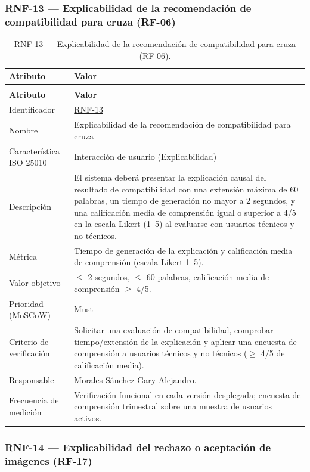 \documentclass[journal,onecolumn]{IEEEtran}
\makeatletter
\newenvironment{atributos}[2]{%
	\small
	\begin{longtable}{@{}>{\raggedright\arraybackslash}p{4.2cm} >{\raggedright\arraybackslash}p{11.2cm}@{}}
		\caption{#2}\label{tab:#1}\\
		\toprule
		\textbf{Atributo} & \textbf{Valor} \\
		\midrule
		\endfirsthead
		\multicolumn{2}{@{}l}{\small\itshape (continuación)}\\
		\toprule
		\textbf{Atributo} & \textbf{Valor} \\
		\midrule
		\endhead
		\bottomrule
		\endlastfoot
	}{%
	\end{longtable}
	\normalsize
}
\makeatother
\begin{document}
	\subsubsection{RNF-13 --- Explicabilidad de la recomendación de compatibilidad para cruza (RF-06)}
	
	\begin{atributos}{RNF-13}{RNF-13 --- Explicabilidad de la recomendación de compatibilidad para cruza (RF-06).}
		Identificador & \hyperref[tab:RNF-13]{RNF-13} \\
		Nombre & Explicabilidad de la recomendación de compatibilidad para cruza \\
		Característica ISO 25010 & Interacción de usuario (Explicabilidad) \\
		Descripción & El sistema deberá presentar la explicación causal del resultado de compatibilidad con una extensión máxima de 60 palabras, un tiempo de generación no mayor a 2 segundos, y una calificación media de comprensión igual o superior a 4/5 en la escala Likert (1–5) al evaluarse con usuarios técnicos y no técnicos. \\
		Métrica & Tiempo de generación de la explicación y calificación media de comprensión (escala Likert 1--5). \\
		Valor objetivo & $\leq$ 2 segundos, $\leq$ 60 palabras, calificación media de comprensión $\geq$ 4/5. \\
		Prioridad (MoSCoW) & Must \\
		Criterio de verificación & Solicitar una evaluación de compatibilidad, comprobar tiempo/extensión de la explicación y aplicar una encuesta de comprensión a usuarios técnicos y no técnicos ($\geq$ 4/5 de calificación media). \\
		Responsable & Morales Sánchez Gary Alejandro. \\
		Frecuencia de medición & Verificación funcional en cada versión desplegada; encuesta de comprensión trimestral sobre una muestra de usuarios activos. \\
	\end{atributos}
	
	\subsubsection{RNF-14 --- Explicabilidad del rechazo o aceptación de imágenes (RF-17)}
	
\end{document}
